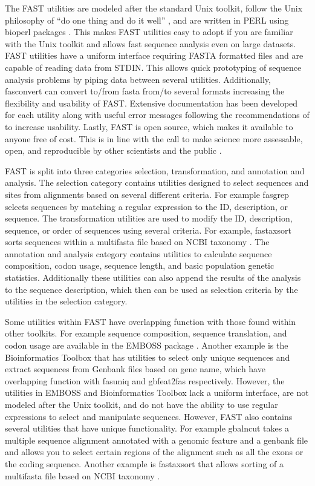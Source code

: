 \documentclass{frontiersSCNS} %
\begin{document}
The FAST utilities are modeled after the standard Unix toolkit\citep{Peek2001}, follow the Unix philosophy of  ``do one thing and do it well'' \citep{Stutz2000}, and are written in PERL using bioperl packages \citep{Stajich2002}. This makes FAST utilities easy to adopt if you are familiar with the Unix toolkit and allows fast sequence analysis even on large datasets. FAST utilities have a uniform interface requiring FASTA formatted files and are capable of reading data from STDIN. This allows quick prototyping of sequence analysis problems by piping data between several utilities. Additionally, fasconvert can convert to/from fasta from/to several formats increasing the flexibility and usability of FAST. Extensive documentation has been developed for each utility along with useful error messages following the recommendations of \cite{Seemann2013} to increase usability. Lastly, FAST is open source, which makes it available to anyone free of cost. This is in line with the call to make science more assessable, open, and reproducible by other scientists and the public \citep{Groves2012}.   

FAST is split into three categories selection, transformation, and annotation and analysis. The selection category contains utilities designed to select sequences and sites from alignments based on several different criteria. For example fasgrep selects sequences by matching a regular expression to the ID, description, or sequence. The transformation utilities are used to modify the ID, description, sequence, or order of sequences using several criteria. For example, fastaxsort sorts sequences within a multifasta file based on NCBI taxonomy \citep{Benson2009, Sayers2009}. The annotation and analysis category contains utilities to calculate sequence composition, codon usage, sequence length, and basic population genetic statistics. Additionally these utilities can also append the results of the analysis to the sequence description, which then can be used as selection criteria by the utilities in the selection category.

Some utilities within FAST have overlapping function with those found within other toolkits. For example sequence composition, sequence translation, and codon usage are available in the EMBOSS package \citep{Rice2000}. Another example is the Bioinformatics Toolbox \citep{White2014} that has utilities to select only unique sequences and extract sequences from Genbank files based on gene name, which have overlapping function with fasuniq and gbfeat2fas respectively. However, the utilities in EMBOSS \citep{Rice2000} and Bioinformatics Toolbox \citep{White2014} lack a uniform interface, are not modeled after the Unix toolkit, and do not have the ability to use regular expressions to select and manipulate sequences. However, FAST also contains several utilities that have unique functionality. For example gbalncut takes a multiple sequence alignment annotated with a genomic feature and a genbank file and allows you to select certain regions of the alignment such as all the exons or the coding sequence. Another example is fastaxsort that allows sorting of a multifasta file based on NCBI taxonomy \citep{Benson2009, Sayers2009}. 
\end{document}

